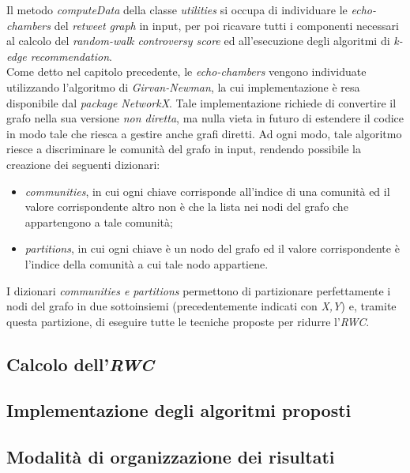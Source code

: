 Il metodo \textit{computeData} della classe \textit{utilities} si occupa di individuare le \textit{echo-chambers} del \textit{retweet graph} in input, per poi ricavare tutti i componenti necessari al calcolo del \textit{random-walk controversy score} ed all'esecuzione degli algoritmi di \textit{k-edge recommendation}.
\\Come detto nel capitolo precedente, le \textit{echo-chambers} vengono individuate utilizzando l'algoritmo di \textit{Girvan-Newman}, la cui implementazione è resa disponibile dal \textit{package NetworkX}. Tale implementazione richiede di convertire il grafo nella sua versione \textit{non diretta}, ma nulla vieta in futuro di estendere il codice in modo tale che riesca a gestire anche grafi diretti. 
Ad ogni modo, tale algoritmo riesce a discriminare le comunità del grafo in input, rendendo possibile la creazione dei seguenti dizionari:
\begin{itemize}
\item \textit{communities}, in cui ogni chiave corrisponde all'indice di una comunità ed il valore corrispondente altro non è che la lista nei nodi del grafo che appartengono a tale comunità; 
\item \textit{partitions}, in cui ogni chiave è un nodo del grafo ed il valore corrispondente è l'indice della comunità a cui tale nodo appartiene.
\end{itemize}
I dizionari \textit{communities e partitions} permettono di partizionare perfettamente i nodi del grafo in due sottoinsiemi (precedentemente indicati con \textit{X,Y}) e, tramite questa partizione, di eseguire tutte le tecniche proposte per ridurre l'\textit{RWC}.

\subsection{Calcolo dell'\textit{RWC}}

\subsection{Implementazione degli algoritmi proposti}

\subsection{Modalità di organizzazione dei risultati}





